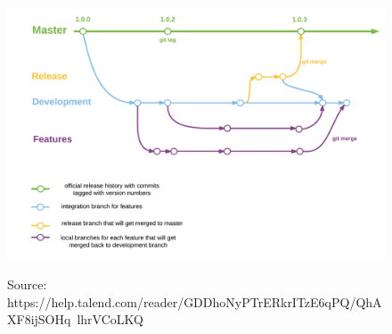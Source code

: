 \documentclass[a4paper, 12pt]{article}
\begin{document}
		\begin{figure}[h]
			\centering
			\includegraphics[width=.9\linewidth]{gitbranches.png}
			\label{fig1}
			\caption{Source: https://help.talend.com/reader/GDDhoNyPTrERkrITzE6qPQ/QhAXF8ijSOHq~lhrVCoLKQ}
		\end{figure}
\end{document}

